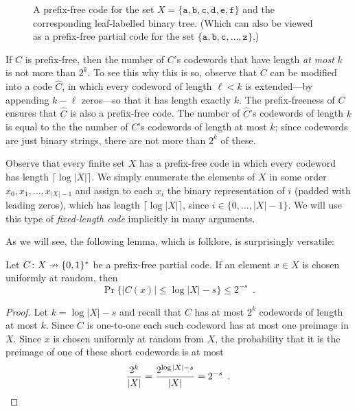 \documentclass{patmorin}
\begin{document}
\begin{figure}
  \caption{A prefix-free code for the set
    $X=\{\mathtt{a},\mathtt{b},\mathtt{c},\mathtt{d},\mathtt{e},\mathtt{f}\}$
    and the corresponding leaf-labelled binary tree. (Which can also be viewed as a prefix-free partial code for the set $\{\mathtt{a},\mathtt{b},\mathtt{c},\ldots,\mathtt{z}\}$.)}
\end{figure}

If $C$ is prefix-free, then the number of $C$'s codewords that have length
\emph{at most} $k$ is not more than $2^k$. To see this why this is so,
observe that $C$ can be modified into a code $\hat C$, in which every
codeword of length $\ell <k$ is extended---by appending $k-\ell$ zeros---so that
it has length exactly $k$. The prefix-freeness of $C$ ensures that $\hat
C$ is also a prefix-free code. The number of $\hat C$'s codewords of
length $k$ is equal to the the number of $C$'s codewords of length at
most $k$; since codewords are just binary strings, there are not more
than $2^k$ of these.

Observe that every finite set $X$ has a prefix-free code in which every
codeword has length $\lceil\log |X|\rceil$. We simply enumerate the
elements of $X$ in some order $x_0,x_1,\ldots,x_{|X|-1}$ and assign to
each $x_i$ the binary representation of $i$ (padded with leading zeros),
which has length $\lceil\log |X|\rceil$, since $i\in\{0,\ldots,|X|-1\}$.
We will use this type of \emph{fixed-length code} implicitly in many arguments.


As we will see, the following lemma, which is folklore, is surprisingly
versatile:
\begin{lem}
  Let $C\colon X\nrightarrow \{0,1\}^*$ be a prefix-free partial code. If
  an element $x\in X$ is chosen uniformly at random, then 
  \[
  \Pr\{|C(x)|\le \log|X|-s\}\le 2^{-s} \enspace .
  \]
\end{lem}

\begin{proof}
  Let $k=\log|X|-s$ and recall that $C$ has at most $2^{k}$ codewords
  of length at most $k$.  Since $C$ is one-to-one each such codeword has
  at most one preimage in $X$.  Since $x$ is chosen uniformly at random
  from $X$, the probability that it is the preimage of one of these
  short codewords is at most
  \[
     \frac{2^k}{|X|} = \frac{2^{\log|X|-s}}{|X|} = 2^{-s} \enspace . \qedhere 
  \]
\end{proof}
\end{document}
